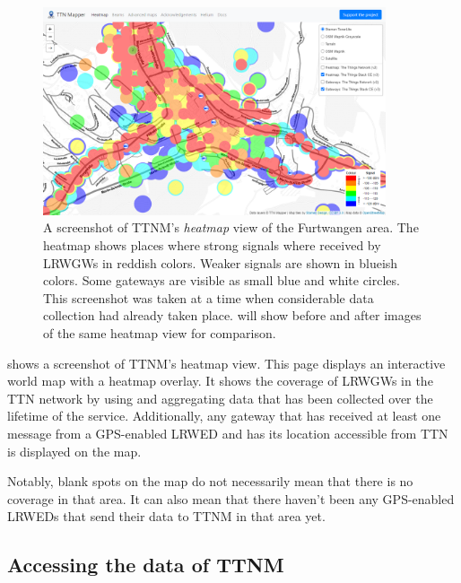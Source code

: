 \begin{figure}[htbp]
    \centering
    \includegraphics[width=0.9\textwidth]{pictures/ttn-mapper/heatmap_with_gateways.png}
    \caption{
        A screenshot of \ac{TTNM}'s \emph{heatmap} view of the Furtwangen area.
        The heatmap shows places where strong signals where received by \aclp{LRWGW} in reddish colors.
        Weaker signals are shown in blueish colors.
        Some gateways are visible as small blue and white circles.
        This screenshot was taken at a time when considerable data collection had already taken place.
         will show before and after images of the same heatmap view for comparison.~\protect\cite{ttn_mapper_ttn_2023}
    }\label{pic:ttn-mapper-heatmap-with-gateways}
\end{figure}

 shows a screenshot of \acl{TTNM}'s heatmap view.
This page displays an interactive world map with a heatmap overlay.
It shows the coverage of \aclp{LRWGW} in the \ac{TTN} network by using and aggregating data that has been collected over the lifetime of the service.
Additionally, any gateway that has received at least one message from a \ac{GPS}-enabled \ac{LRWED} and has its location accessible from \ac{TTN} is displayed on the map.

Notably, blank spots on the map do not necessarily mean that there is no coverage in that area.
It can also mean that there haven't been any \ac{GPS}-enabled \aclp{LRWED} that send their data to \ac{TTNM} in that area yet.

\subsection{Accessing the data of \acl{TTNM}}

